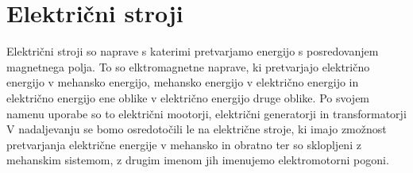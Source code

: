 \documentclass[a4paper,twoside,openright,12pt]{book}
\begin{document}
\chapter{Električni stroji}
Električni stroji so naprave s katerimi pretvarjamo energijo s posredovanjem magnetnega polja. To so elktromagnetne naprave, ki pretvarjajo električno energijo v mehansko energijo, mehansko energijo v električno energijo in električno energijo ene oblike v električno energijo druge oblike. Po svojem namenu uporabe so to električni mootorji, električni generatorji in transformatorji \cite{miljavec2009vezna} V nadaljevanju se bomo osredotočili le na električne stroje, ki imajo zmožnost pretvarjanja električne energije v mehansko in obratno ter so sklopljeni z mehanskim sistemom, z drugim imenom jih imenujemo elektromotorni pogoni.\\  
\end{document}
